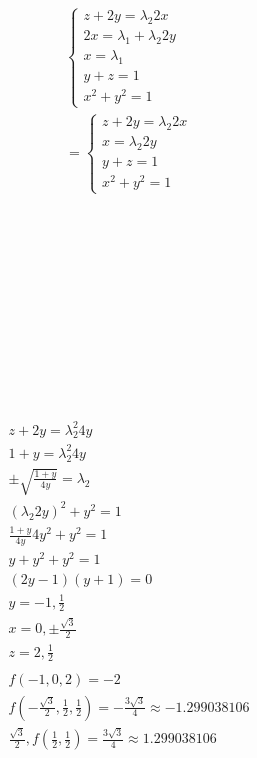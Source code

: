 \documentclass[12pt]{exam}
\begin{document}
\begin{questions}
\begin{solution}
        \begin{multicols*}{2}
            \begin{gather*}
                \begin{cases*}
                    z + 2y = \lambda_2 2x \\
                    2x = \lambda_1 + \lambda_2 2y \\
                    x = \lambda_1 \\
                    y + z = 1 \\
                    x^2 + y^2 = 1
                \end{cases*}\\
                =\begin{cases*}
                    z + 2y = \lambda_2 2x \\
                    x = \lambda_2 2y \\
                    y + z = 1 \\
                    x^2 + y^2 = 1
                \end{cases*} \\
            \end{gather*}
            \\\\\\\\\\\\\\\\\\\\\\\columnbreak
            \begin{gather*}
                z + 2y = \lambda_2^2 4y \\
                1 + y = \lambda_2^2 4y \\
                \pm \sqrt{\frac{1 + y}{4y}} = \lambda_2 \\
                (\lambda_2 2y)^2 + y^2 = 1 \\
                \frac{1 + y}{4y}4y^2 + y^2 = 1 \\
                y + y^2 + y^2 = 1\\
                (2y-1)(y+1) = 0 \\
                y = -1, \frac{1}{2} \\
                x = 0, \pm \frac{\sqrt{3}}{2} \\
                z = 2, \frac{1}{2}\\
                \\
                \boxed {f(-1, 0, 2) = -2} \\
                f(-\frac{\sqrt{3}}{2}, \frac{1}{2}, \frac{1}{2}) = -\frac{3\sqrt{3}}{4} \approx -1.299038106 \\
                \boxed {\frac{\sqrt{3}}{2}, f(\frac{1}{2}, \frac{1}{2}) = \frac{3\sqrt{3}}{4} \approx 1.299038106} \tag*{\qed}
            \end{gather*}
        \end{multicols*}
        

\end{solution}
\end{questions}
\end{document}
